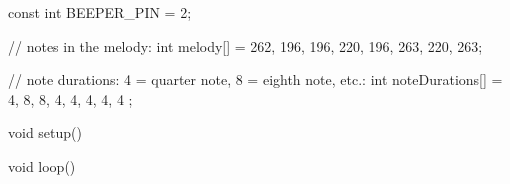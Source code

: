 \begin{javalst}
const int BEEPER_PIN = 2;

// notes in the melody:
int melody[] = {262, 196, 196, 220, 196, 263, 220, 263};

// note durations: 4 = quarter note, 8 = eighth note, etc.:
int noteDurations[] = {4, 8, 8, 4, 4, 4, 4, 4 };

void setup() {



  
    
}

void loop() {





  

















}
\end{javalst}


